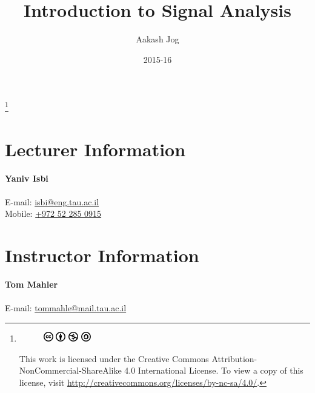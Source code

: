 \documentclass[titlepage, fleqn, a4paper, 12pt, twoside]{article}
\title{Introduction to Signal Analysis}
\author{Aakash Jog}
\date{2015-16}
\theoremstyle{definition}
\theoremstyle{theorem}
\newcommand\blfootnote[1]{%
	\begingroup
	\renewcommand\thefootnote{}\footnote{#1}%
	\addtocounter{footnote}{-1}%
	\endgroup
}
\begin{document}
\maketitle
{}
\begin{titlepage}
\maketitle
\end{titlepage}
\restoregeometry

\blfootnote
{	
	\begin{figure}[H]
		\includegraphics[height = 12pt]{cc.pdf}
		\includegraphics[height = 12pt]{by.pdf}
		\includegraphics[height = 12pt]{nc.pdf}
		\includegraphics[height = 12pt]{sa.pdf}
	\end{figure}
	This work is licensed under the Creative Commons Attribution-NonCommercial-ShareAlike 4.0 International License. To view a copy of this license, visit \url{http://creativecommons.org/licenses/by-nc-sa/4.0/}.
} %

\tableofcontents

\clearpage
{}

\section{Lecturer Information}

\textbf{Yaniv Isbi}\\
~\\
E-mail: \href{mailto:isbi@eng.tau.ac.il}{isbi@eng.tau.ac.il}\\
Mobile: \href{tel:+972522850915}{+972 52 285 0915}

\section{Instructor Information}

\textbf{Tom Mahler}\\
~\\
E-mail: \href{tommahle@mail.tau.ac.il}{tommahle@mail.tau.ac.il}
\end{document}

